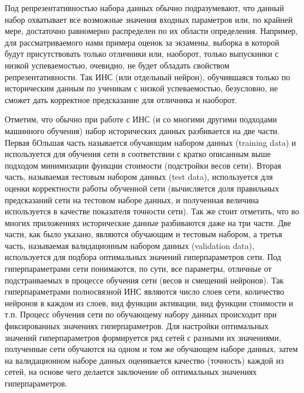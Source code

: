 \documentclass[a4paper,12pt,russian]{article} %
\begin{document}
Под репрезентативностью набора данных обычно подразумевают, что данный набор охватывает все возможные значения входных параметров или, по крайней мере, достаточно равномерно распределен по их области определения.
Например, для рассматриваемого нами примера оценок за экзамены, выборка в которой будут присутствовать только отличники или, наоборот, только выпускники с низкой успеваемостью, очевидно, не будет обладать свойством репрезентативности.
Так ИНС (или отдельный нейрон), обучившаяся только по историческим данным по ученикам с низкой успеваемостью, безусловно, не сможет дать корректное предсказание для отличника и наоборот.
	
Отметим, что обычно при работе с ИНС (и со многими другими подходами машинного обучения) набор исторических данных разбивается на две части.
Первая бОльшая часть называется обучающим набором данных (training data) и используется для обучения сети в соответствии с кратко описанным выше подходом минимизации функции стоимости (подстройки весов сети).
Вторая часть, называемая тестовым набором данных (test data), используется для оценки корректности работы обученной сети (вычисляется доля правильных предсказаний сети на тестовом наборе данных, и полученная величина используется в качестве показателя точности сети).
Так же стоит отметить, что во многих приложениях исторические данные разбиваются даже на три части.
Две части, как было указано, являются обучающим и тестовым набором, а третья часть, называемая валидационным набором данных (validation data), используется для подбора оптимальных значений гиперпараметров сети.
Под гиперпараметрами сети понимаются, по сути, все параметры, отличные от подстраиваемых в процессе обучения сети (весов и смещений нейронов).
Так гиперпараметрами полносвязной ИНС являются число слоев сети, количество нейронов в каждом из слоев, вид функции активации, вид функции стоимости и т.п.
Процесс обучения сети по обучающему набору данных происходит при фиксированных значениях гиперпараметров.
Для настройки оптимальных значений гиперпараметров формируется ряд сетей с разными их значениями, полученные сети обучаются на одном и том же обучающем наборе данных, затем на валидационном наборе данных оценивается качество (точность) каждой из сетей, на основе чего делается заключение об оптимальных значениях гиперпараметров.
\end{document}
